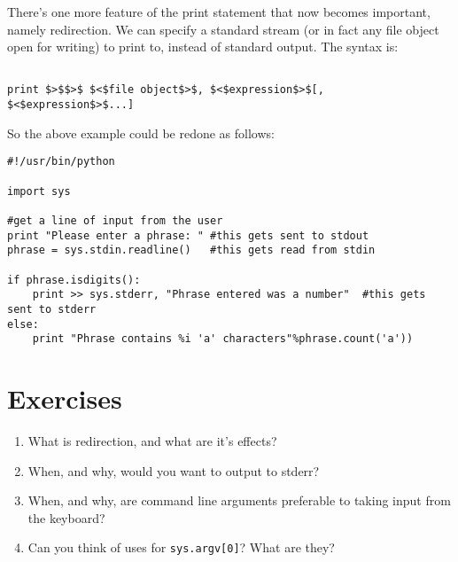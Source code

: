 There's one more feature of the print statement that now becomes important, namely redirection. We can specify a standard stream (or in fact any file object open for writing) to print to, instead of standard output. The syntax is:
\begin{lstlisting}

print $>$$>$ $<$file object$>$, $<$expression$>$[, $<$expression$>$...]
\end{lstlisting}

So the above example could be redone as follows:
\begin{lstlisting}
#!/usr/bin/python

import sys

#get a line of input from the user
print "Please enter a phrase: "	#this gets sent to stdout
phrase = sys.stdin.readline()	#this gets read from stdin

if phrase.isdigits():
    print >> sys.stderr, "Phrase entered was a number"	#this gets sent to stderr
else:
    print "Phrase contains %i 'a' characters"%phrase.count('a'))
\end{lstlisting}

\section{Exercises}
\begin{enumerate}
	\item What is redirection, and what are it's effects?
	\item When, and why, would you want to output to stderr?
	\item When, and why, are command line arguments preferable to taking    input from the keyboard?
	\item Can you think of uses for 
\texttt{sys.argv[0]}? What are they?
\end{enumerate}
